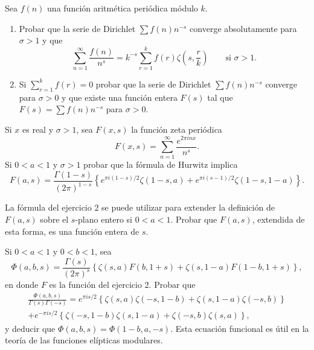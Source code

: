 \documentclass[12pt,a4paper]{book}
\begin{document}
    \begin{ejercicio}
        Sea $f(n)$ una función aritmética periódica módulo $k$.
        \begin{enumerate}
            \item[(a)] Probar que la serie de Dirichlet $\sum f(n)n^{-s}$ converge
            absolutamente para $\sigma>1$ y que
            \begin{equation*}
                \sum_{n=1}^{\infty}\frac{f(n)}{n^{s}}=k^{-s}\sum_{r=1}^{k}f(r)\zeta\left(s,\frac{r}{k}\right)\qquad\text{si }\sigma>1.
            \end{equation*}
            \item[(b)] Si $\sum_{r=1}^{k}f(r)=0$ probar que la serie de Dirichlet
            $\sum f(n)n^{-s}$ converge para $\sigma>0$ y que existe una función entera $F(s)$
            tal que $F(s)=\sum f(n)n^{-s}$ para $\sigma>0$.
        \end{enumerate}
    \end{ejercicio}

    \begin{ejercicio}
        Si $x$ es real y $\sigma>1$, sea $F(x,s)$ la función zeta periódica
        \begin{equation*}
            F(x,s)=\sum_{n=1}^{\infty}\frac{e^{2\pi inx}}{n^{s}}.
        \end{equation*}
        Si $0<a<1$ y $\sigma>1$ probar que la fórmula de Hurwitz implica
        \begin{equation*}
            F(a,s)=\frac{\Gamma(1-s)}{(2\pi)^{1-s}}\left\{e^{\pi i(1-s)/2}\zeta(1-s,a)+e^{\pi i(s-1)/2}\zeta(1-s,1-a)\right\}.
        \end{equation*}
    \end{ejercicio}

    \begin{ejercicio}
        La fórmula del ejercicio 2 se puede utilizar para extender la definición de $F(a,s)$
        sobre el $s$-plano entero si $0<a<1$. Probar que $F(a,s)$, extendida de esta forma, es
        una función entera de $s$.
    \end{ejercicio}

    \begin{ejercicio}
        Si $0<a<1$ y $0<b<1$, sea
        \begin{equation*}
            \Phi(a,b,s)=\frac{\Gamma(s)}{(2\pi)^{s}}\left\{\zeta(s,a)F(b,1+s)+\zeta(s,1-a)F(1-b,1+s)\right\},
        \end{equation*}
        en donde $F$ es la función del ejercicio 2. Probar que
        \begin{multline*}
            \frac{\Phi(a,b,s)}{\Gamma(s)\Gamma(-s)}=e^{\pi is/2}\left\{\zeta(s,a)\zeta(-s,1-b)+\zeta(s,1-a)\zeta(-s,b)\right\}\\
            +e^{-\pi is/2}\left\{\zeta(-s,1-b)\zeta(s,1-a)+\zeta(-s,b)\zeta(s,a)\right\},
        \end{multline*}
        y deducir que $\Phi(a,b,s)=\Phi(1-b,a,-s)$. Esta ecuación funcional es útil en la teoría
        de las funciones elípticas modulares.
    \end{ejercicio}
\end{document}
